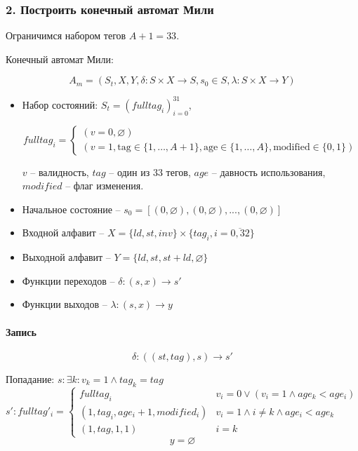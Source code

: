 
\subsubsection*{2. Построить конечный автомат Мили}

Ограничимся набором тегов $A + 1 = 33$.
\par\medskip

Конечный автомат Мили:

$$A_m = (S_t,X,Y,\delta:S\times X \rightarrow S, s_0 \in S, \lambda : S\times X \rightarrow Y)$$

\begin{itemize}[itemindent=0pt,leftmargin=0em,topsep=0pt,itemsep=-1ex,partopsep=1ex,parsep=1ex]
	\item Набор состояний: $S_t = (fulltag_i)^{31}_{i=0}$,

	\[
	fulltag_i =
	\begin{cases}
	  (v = 0, \varnothing) \\
	  (v = 1, \text{tag} \in \{1, \dots, A+1\}, \text{age} \in \{1, \dots, A\}, \text{modified} \in \{0,1\})
	\end{cases}
	\]

	$v$ -- валидность, $tag$ -- один из 33 тегов, $age$ -- давность использования, $modified$ -- флаг изменения.
	\par\medskip

	\item Начальное состояние -- $s_0 = [(0, \varnothing),(0, \varnothing),...,(0, \varnothing)]$
	\item Входной алфавит -- $X = \{ld,st,inv\}\times\{tag_i,i=\overline{0,32}\}$
	\item Выходной алфавит -- $Y = \{ld,st,st+ld,\varnothing\}$
	\item Функции переходов -- $\delta: (s,x)\rightarrow s'$
	\item Функции выходов -- $\lambda: (s,x) \rightarrow y$
\end{itemize}

\paragraph*{Запись}

$$\delta : ((st,tag),s) \rightarrow s'$$

Попадание: $s: \exists k : v_k = 1 \land tag_k = tag$
\[
s':fulltag'_i =
\begin{cases}
	fulltag_i & v_i = 0 \lor (v_i = 1 \land age_k < age_i)\\
	(1,tag_i,age_{i}+1,modified_i) & v_i = 1 \land i \neq k \land age_i < age_k \\
	(1,tag,1,1) & i = k
\end{cases}
\]
$$y = \varnothing$$

